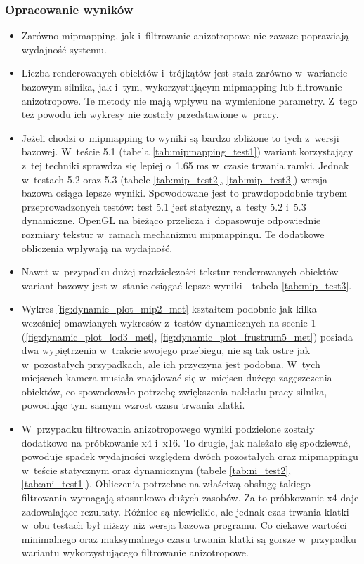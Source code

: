 \documentclass[a4paper,twoside,12pt]{book}
\begin{document}
\subsubsection{Opracowanie wyników}
\begin{itemize}
    \item Zarówno mipmapping, jak i~filtrowanie anizotropowe nie zawsze poprawiają wydajność systemu.
    \item Liczba renderowanych obiektów i~trójkątów jest stała zarówno w~wariancie bazowym silnika, jak i~tym, wykorzystującym mipmapping lub filtrowanie anizotropowe. Te metody nie mają wpływu na wymienione parametry. Z~tego też powodu ich wykresy nie zostały przedstawione w~pracy.
    \item Jeżeli chodzi o~mipmapping to wyniki są bardzo zbliżone to tych z~wersji bazowej. W~teście 5.1 (tabela \ref{tab:mipmapping_test1}) wariant korzystający z~tej techniki sprawdza się lepiej o~1.65 ms w~czasie trwania ramki. Jednak w~testach 5.2 oraz 5.3 (tabele \ref{tab:mip_test2}, \ref{tab:mip_test3}) wersja bazowa osiąga lepsze wyniki. Spowodowane jest to prawdopodobnie trybem przeprowadzonych testów: test 5.1 jest statyczny, a~testy 5.2 i~5.3 dynamiczne. OpenGL na bieżąco przelicza i~dopasowuje odpowiednie rozmiary tekstur w~ramach mechanizmu mipmappingu. Te dodatkowe obliczenia wpływają na wydajność.
    \item Nawet w~przypadku dużej rozdzielczości tekstur renderowanych obiektów wariant bazowy jest w~stanie osiągać lepsze wyniki - tabela \ref{tab:mip_test3}.
    \item Wykres \ref{fig:dynamic_plot_mip2_met} kształtem podobnie jak kilka wcześniej omawianych wykresów z~testów dynamicznych na scenie 1 (\ref{fig:dynamic_plot_lod3_met}, \ref{fig:dynamic_plot_frustrum5_met}) posiada dwa wypiętrzenia w~trakcie swojego przebiegu, nie są tak ostre jak w~pozostałych przypadkach, ale ich przyczyna jest podobna. W~tych miejscach kamera musiała znajdować się w~miejscu dużego zagęszczenia obiektów, co spowodowało potrzebę zwiększenia nakładu pracy silnika, powodując tym samym wzrost czasu trwania klatki.
    \item W~przypadku filtrowania anizotropowego wyniki podzielone zostały dodatkowo na próbkowanie x4 i~x16. To drugie, jak należało się spodziewać, powoduje spadek wydajności względem dwóch pozostałych oraz mipmappingu w~teście statycznym oraz dynamicznym (tabele \ref{tab:ni_test2}, \ref{tab:ani_test1}). Obliczenia potrzebne na właściwą obsługę takiego filtrowania wymagają stosunkowo dużych zasobów. Za to próbkowanie x4 daje zadowalające rezultaty. Różnice są niewielkie, ale jednak czas trwania klatki w~obu testach był niższy niż wersja bazowa programu. Co ciekawe wartości minimalnego oraz maksymalnego czasu trwania klatki są gorsze w~przypadku wariantu wykorzystującego filtrowanie anizotropowe.

\end{itemize}
\end{document}

